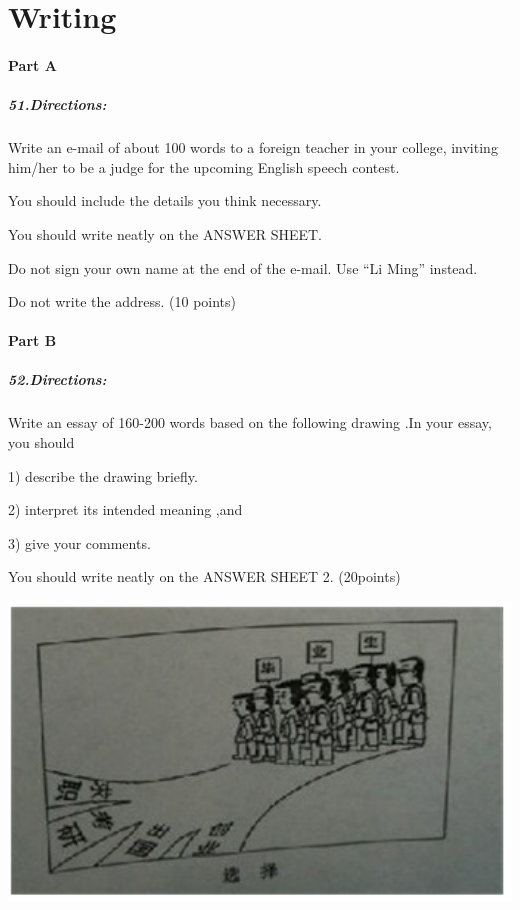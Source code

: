 \section{Writing}
\paragraph{Part A}
\subparagraph{51.Directions:}

Write an e-mail of about 100 words to a foreign teacher in your college, inviting him/her to be a judge for the upcoming English speech contest.

You should include the details you think necessary.

You should write neatly on the ANSWER SHEET.

Do not sign your own name at the end of the e-mail. Use ``Li Ming'' instead.

Do not write the address. (10 points)

\paragraph{Part B}
\subparagraph{52.Directions:}

Write an essay of 160-200 words based on the following drawing .In your essay, you should

1) describe the drawing briefly.

2) interpret its intended meaning ,and

3) give your comments.

You should write neatly on the ANSWER SHEET 2. (20points)

\begin{center}\includegraphics[width=14cm]{8.png}\end{center}